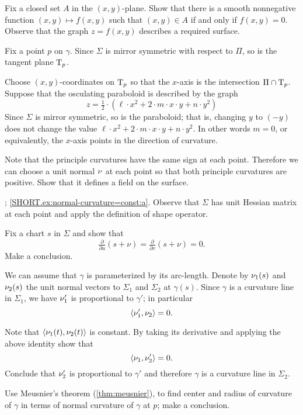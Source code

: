 Fix a closed set $A$ in the $(x,y)$-plane.
Show that there is a smooth nonnegative function $(x,y)\mapsto f(x,y)$ such that $(x,y)\in A$ if and only if $f(x,y)=0$.
Observe that the graph $z=f(x,y)$ describes a required surface.

Fix a point $p$ on $\gamma$.
Since $\Sigma$ is mirror symmetric with respect to $\Pi$,
so is the tangent plane $\mathrm{T}_p$.

Choose $(x,y)$-coordinates on $\mathrm{T}_p$ so that the $x$-axis is the intersection $\Pi\cap  \mathrm{T}_p$.
Suppose that the osculating paraboloid is described by the graph 
\[z=\tfrac12\cdot(\ell\cdot x^2+2\cdot m\cdot x\cdot y+n\cdot y^2)\]
Since $\Sigma$ is mirror symmetric, so is the paraboloid;
that is, changing $y$ to $(-y)$ does not change the value 
$\ell\cdot x^2+2\cdot m\cdot x\cdot y+n\cdot y^2$.
In other words $m=0$, or equivalently, the $x$-axis points in the direction of curvature.

 Note that the principle curvatures have the same sign at each point.
Therefore we can choose a unit normal $\nu$ at each point so that both principle curvatures are positive.
Show that it defines a field on the surface.


\parbf{\ref{ex:normal-curvature=const}}; \ref{SHORT.ex:normal-curvature=const:a}.
Observe that $\Sigma$ has unit Hessian matrix at each point and apply the definition of shape operator.

 Fix a chart $s$ in $\Sigma$ and show that 
\[\tfrac{\partial }{\partial u}(s+\nu)
=
\tfrac{\partial }{\partial v}(s+\nu)
=
0.\]
Make a conclusion.

We can assume that $\gamma$ is parameterized by its arc-length.
Denote by $\nu_1(s)$ and $\nu_2(s)$ the unit normal vectors to $\Sigma_1$ and $\Sigma_2$ at $\gamma(s)$.
Since $\gamma$ is a curvature line in $\Sigma_1$, we have 
$\nu_1'$ is proportional to $\gamma'$;
in particular 
\[\langle\nu_1',\nu_2\rangle=0.\]

Note that $\langle \nu_1(t),\nu_2(t)\rangle$ is constant.
By taking its derivative and applying the above identity show that
\[\langle\nu_1,\nu_2'\rangle=0.\]
Conclude that $\nu_2'$ is proportional to $\gamma'$
and therefore $\gamma$ is a curvature line in $\Sigma_2$.


 Use Meusnier's theorem (\ref{thm:meusnier}), to find center and radius of curvature of $\gamma$ in terms of normal curvature of $\gamma$ at $p$;
make a conclusion.


